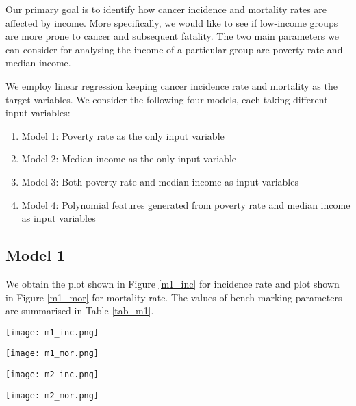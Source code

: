 \documentclass[conference]{IEEEtran}
\begin{document}
Our primary goal is to identify how cancer incidence and mortality rates are affected by income. More specifically, we would like to see if low-income groups are more prone to cancer and subsequent fatality. The two main parameters we can consider for analysing the income of a particular group are poverty rate and median income.

We employ linear regression keeping cancer incidence rate and mortality as the target variables. We consider the following four models, each taking different input variables:
\begin{enumerate}
    \item Model 1: Poverty rate as the only input variable
    \item Model 2: Median income as the only input variable
    \item Model 3: Both poverty rate and median income as input variables
    \item Model 4: Polynomial features generated from poverty rate and median income as input variables
\end{enumerate}

\subsection{Model 1}

We obtain the plot shown in Figure \ref{m1_inc} for incidence rate and plot shown in Figure \ref{m1_mor} for mortality rate. The values of bench-marking parameters are summarised in Table \ref{tab_m1}.

\begin{figure*}
    \centering
    \texttt{[image: m1\_inc.png]}
    \caption{Incidence prediction from poverty rate}
    \label{m1_inc}
\end{figure*}

\begin{figure*}
    \centering
    \texttt{[image: m1\_mor.png]}
    \caption{Mortality prediction from poverty rate}
    \label{m1_mor}
\end{figure*}

\begin{figure*}
    \centering
    \texttt{[image: m2\_inc.png]}
    \caption{Incidence prediction from median income}
    \label{m2_inc}
\end{figure*}

\begin{figure*}
    \centering
    \texttt{[image: m2\_mor.png]}
    \caption{Mortality prediction from median income}
    \label{m2_mor}
\end{figure*}
\end{document}
